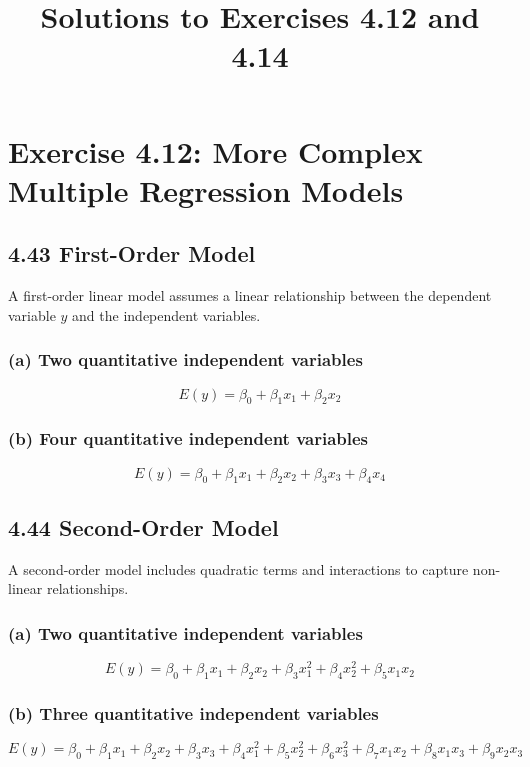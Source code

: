 \documentclass{article}
\title{Solutions to Exercises 4.12 and 4.14}
\author{}
\date{}
\begin{document}
\maketitle

\section{Exercise 4.12: More Complex Multiple Regression Models}

\subsection{4.43 First-Order Model}
A first-order linear model assumes a linear relationship between the dependent variable \( y \) and the independent variables.

\subsubsection{(a) Two quantitative independent variables}
\[
E(y) = \beta_0 + \beta_1 x_1 + \beta_2 x_2
\]

\subsubsection{(b) Four quantitative independent variables}
\[
E(y) = \beta_0 + \beta_1 x_1 + \beta_2 x_2 + \beta_3 x_3 + \beta_4 x_4
\]

\subsection{4.44 Second-Order Model}
A second-order model includes quadratic terms and interactions to capture non-linear relationships.

\subsubsection{(a) Two quantitative independent variables}
\[
E(y) = \beta_0 + \beta_1 x_1 + \beta_2 x_2 + \beta_3 x_1^2 + \beta_4 x_2^2 + \beta_5 x_1 x_2
\]

\subsubsection{(b) Three quantitative independent variables}
\[
E(y) = \beta_0 + \beta_1 x_1 + \beta_2 x_2 + \beta_3 x_3 + \beta_4 x_1^2 + \beta_5 x_2^2 + \beta_6 x_3^2 + \beta_7 x_1 x_2 + \beta_8 x_1 x_3 + \beta_9 x_2 x_3
\]
\end{document}
